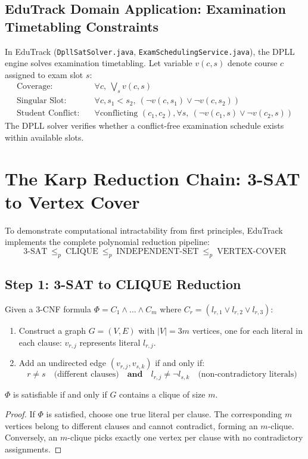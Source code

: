 \subsection{EduTrack Domain Application: Examination Timetabling Constraints}
In EduTrack (\texttt{DpllSatSolver.java}, \texttt{ExamSchedulingService.java}), the DPLL engine solves examination timetabling. Let variable $v(c, s)$ denote course $c$ assigned to exam slot $s$:
\begin{align}
\text{Coverage:} &\quad \forall c, \ \bigvee_{s} v(c, s) \nonumber \\
\text{Singular Slot:} &\quad \forall c, s_1 < s_2, \ (\neg v(c, s_1) \lor \neg v(c, s_2)) \nonumber \\
\text{Student Conflict:} &\quad \forall \text{conflicting } (c_1, c_2), \forall s, \ (\neg v(c_1, s) \lor \neg v(c_2, s))
\end{align}
The DPLL solver verifies whether a conflict-free examination schedule exists within available slots.

\section{The Karp Reduction Chain: 3-SAT to Vertex Cover}
To demonstrate computational intractability from first principles, EduTrack implements the complete polynomial reduction pipeline:
\begin{equation}
\text{3-SAT} \ \le_p \ \text{CLIQUE} \ \le_p \ \text{INDEPENDENT-SET} \ \le_p \ \text{VERTEX-COVER}
\end{equation}

\subsection{Step 1: 3-SAT to CLIQUE Reduction}
Given a 3-CNF formula $\Phi = C_1 \land \dots \land C_m$ where $C_r = (l_{r, 1} \lor l_{r, 2} \lor l_{r, 3})$:
\begin{enumerate}
    \item Construct a graph $G = (V, E)$ with $|V| = 3m$ vertices, one for each literal in each clause: $v_{r, j}$ represents literal $l_{r, j}$.
    \item Add an undirected edge $(v_{r, j}, v_{s, k})$ if and only if:
    \begin{equation}
    r \ne s \quad \text{(different clauses)} \quad \textbf{and} \quad l_{r, j} \ne \neg l_{s, k} \quad \text{(non-contradictory literals)}
    \end{equation}
\end{enumerate}
\begin{theorem}
$\Phi$ is satisfiable if and only if $G$ contains a clique of size $m$.
\end{theorem}
\begin{proof}
If $\Phi$ is satisfied, choose one true literal per clause. The corresponding $m$ vertices belong to different clauses and cannot contradict, forming an $m$-clique. Conversely, an $m$-clique picks exactly one vertex per clause with no contradictory assignments.
\end{proof}

